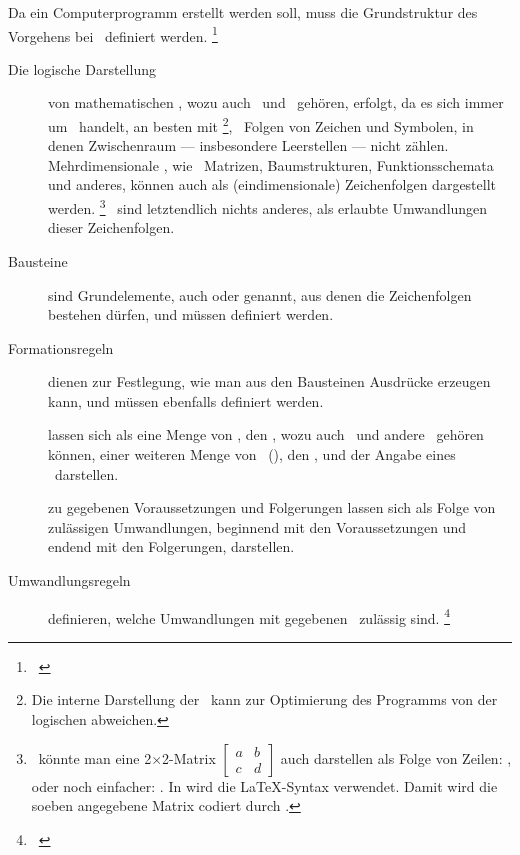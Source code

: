 Da ein Computerprogramm erstellt werden soll, muss die Grundstruktur des Vorgehens bei \Beweisen\ definiert werden.%
\footnote{\seename~\cite{bib:Kalkuel}}

\begin{description}
	\item[Die logische Darstellung] von mathematischen \Aussagen, wozu auch \Axiome\ und \Saetze\ gehören, erfolgt, da es sich immer um \Formeln\ handelt, an besten mit \Zeichenfolgen%
	\footnote{%
		Die interne Darstellung der \Zeichenfolgen\ kann zur Optimierung des Programms von der logischen abweichen.
	},
	\textdh\ Folgen von Zeichen und Symbolen, in denen Zwischenraum --- insbesondere Leerstellen --- nicht zählen.
	Mehrdimensionale \Formeln, wie \textzB\ Matrizen, Baumstrukturen, Funktionsschemata und anderes, können auch als (eindimensionale) Zeichenfolgen dargestellt werden.%
	\footnote{%
		\textZB\ könnte man eine 2$\times$2-Matrix
		$\begin{bmatrix} a & b \\ c & d \end{bmatrix}$
		auch darstellen als Folge von Zeilen: \seqqt{$[(a,b),(c,d)]$}, oder noch einfacher: \seqqt{$[a,b;c,d]$}.
		In \ASBA wird die \LaTeX-Syntax verwendet.
		Damit wird die soeben angegebene Matrix codiert durch .
	}
	\Beweise\ sind letztendlich nichts anderes, als erlaubte Umwandlungen dieser Zeichenfolgen.
	\item[Bausteine] sind Grundelemente, auch  oder  genannt, aus denen die Zeichenfolgen bestehen dürfen, und müssen definiert werden.
	\item[Formationsregeln] dienen zur Festlegung, wie man aus den Bausteinen Ausdrücke erzeugen kann, und müssen ebenfalls definiert werden.
	\item[\Saetze] lassen sich als eine Menge von \Formeln, den \Voraussetzungen, wozu auch \Axiome\ und andere \Saetze\ gehören können, einer weiteren Menge von \Formeln\ (\Zeichenfolgen), den \Folgerungen, und der Angabe eines \Beweises\ darstellen.
	\item[\Beweise] zu gegebenen Voraussetzungen und Folgerungen lassen sich als Folge von zulässigen Umwandlungen, beginnend mit den Voraussetzungen und endend mit den Folgerungen, darstellen.
	\item[Umwandlungsregeln] definieren, welche Umwandlungen mit gegebenen \Formelmengen\ zulässig sind.%
	\footnote{\seename~\cite{bib:Rautenberg,bib:Schlussregel,bib:NatuerlichesSchliessen}}
\end{description}

\Endchapter
